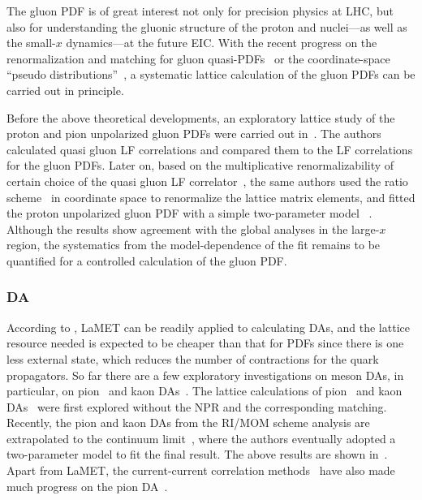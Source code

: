 The gluon PDF is of great interest not only for precision physics at LHC, but also for understanding the gluonic structure of the proton and nuclei---as well as the small-$x$ dynamics---at the future EIC.
%
With the recent progress on the renormalization and matching for gluon quasi-PDFs~\cite{Wang:2017eel,Wang:2017qyg,Zhang:2018diq,Li:2018tpe,Wang:2019tgg} or the coordinate-space ``pseudo distributions''~\cite{Balitsky:2019krf}, a systematic lattice calculation of the gluon PDFs can be carried out in principle.

Before the above theoretical developments, an exploratory lattice study of the proton and pion unpolarized gluon PDFs were carried out in~\cite{Fan:2018dxu}. The authors calculated quasi gluon LF correlations and compared them to the LF correlations for the gluon PDFs. Later on, based on the multiplicative renormalizability of certain choice of the quasi gluon LF correlator~\cite{Zhang:2018diq}, the same authors used the ratio scheme~\cite{Balitsky:2019krf} in coordinate space to renormalize the lattice matrix elements, and fitted the proton unpolarized gluon PDF with a simple two-parameter model ~\cite{Fan:2020cpa}. Although the results show agreement with the global analyses in the large-$x$ region, the systematics from the model-dependence of the fit remains to be quantified for a controlled calculation of the gluon PDF.

\subsubsection{DA}
\label{sec:lattice-DA}

According to , LaMET can be readily applied to calculating DAs, and the lattice resource needed is expected to be cheaper than that for PDFs since there is one less external state, which reduces the number of contractions for the quark propagators.
%
So far there are a few exploratory investigations on meson DAs, in particular, on pion~\cite{Zhang:2017bzy} and kaon DAs~\cite{Chen:2017gck}.
%
The lattice calculations of pion~\cite{Zhang:2017bzy} and kaon DAs~\cite{Chen:2017gck} were first explored without the NPR and the corresponding matching. Recently, the pion and kaon DAs from the RI/MOM scheme analysis are extrapolated to the continuum limit~\cite{Zhang:2020gaj}, where the authors eventually adopted a two-parameter model to fit the final result.
%
The above results are shown in~.
%
Apart from LaMET, the current-current correlation methods~\cite{Braun:2007wv,Braun:2015axa,Detmold:2005gg} have also made much progress on the pion DA~\cite{Bali:2019dqc,Detmold:2018kwu,Detmold:2020lev}.
%

